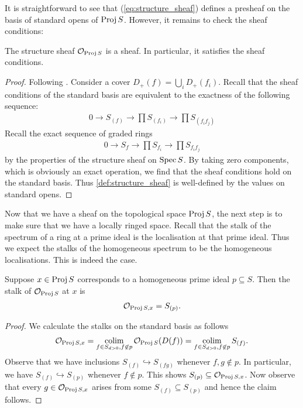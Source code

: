 \documentclass{article}
\begin{document}
It is straightforward to see that (\ref{eq:structure_sheaf})
defines a presheaf on the basis of standard opens of $\operatorname{Proj} S$.
However, it remains to check the sheaf conditions:

\begin{proposition}
  The structure sheaf $\mathcal O_{\operatorname{Proj} S}$ is a sheaf.
  In particular, it satisfies the sheaf conditions.
  \begin{proof}
    Following \cite{ellingsrud2023}.
    Consider a cover $D_+(f) = \bigcup_i D_+(f_i)$. Recall that the
    sheaf conditions of the standard basis are equivalent to the
    exactness of the following sequence:
    \begin{align}\label{eq:sheaf_condition}
      0 \longrightarrow
      S_{(f)} \longrightarrow
      \prod S_{(f_i)} \longrightarrow
      \prod S_{(f_if_j)}
    \end{align}
    Recall the exact sequence of graded rings
    \begin{align*}
      0 \longrightarrow
      S_{f} \longrightarrow
      \prod S_{f_i} \longrightarrow
      \prod S_{f_if_j}
    \end{align*}
    by the properties of the structure sheaf on $\operatorname{Spec} S$. By taking
    zero components, which is obviously an exact operation, we find
    that the sheaf conditions hold on the standard basis. Thus
    \ref{def:structure_sheaf} is well-defined by the values on
    standard opens.
  \end{proof}
\end{proposition}

Now that we have a sheaf on the topological space $\operatorname{Proj} S$,
the next step is to make sure that we have a locally ringed space.
Recall that the stalk of the spectrum of a ring at a prime ideal
is the localisation at that prime ideal. Thus we expect the stalks
of the homogeneous spectrum to be the homogeneous localisations.
This is indeed the case.

\begin{proposition}\label{thm:stalks}
  Suppose $x\in\operatorname{Proj} S$
  corresponds to a homogeneous prime ideal $p\subseteq S$. Then the
  stalk of $\mathcal O_{\operatorname{Proj} S}$ at $x$ is
  \begin{align*}
    \mathcal O_{\operatorname{Proj} S,x} = S_{(p)}.
  \end{align*}
  \begin{proof}
    We calculate the stalks on the standard basis as follows
    \begin{align*}
      \mathcal O_{\Proj S,x}
      = \colim_{f\in S_{d>0},f\not\in p} \mathcal O_{\Proj S}(D(f))
      = \colim_{f\in S_{d>0},f\not\in p} S_{(f)}.
    \end{align*}
    Observe that we have inclusions $S_{(f)}\hookrightarrow S_{(fg)}$
    whenever $f,g\not\in p$. In particular, we have
    $S_{(f)} \hookrightarrow S_{(p)}$ whenever $f\not\in p$.
    This shows $S_{(p)}\subseteq \mathcal O_{\operatorname{Proj} S, x}$.
    Now observe that every $g\in\mathcal O_{\operatorname{Proj} S,x}$
    arises from some $S_{(f)}\subseteq S_{(p)}$ and hence
    the claim follows.
  \end{proof}
\end{proposition}
\end{document}
